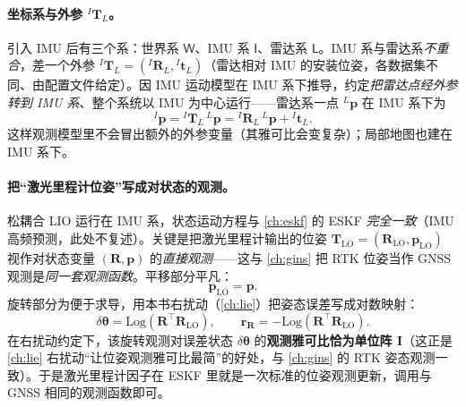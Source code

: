 \paragraph{坐标系与外参 ${}^I\mathbf{T}_L$。}
引入 IMU 后有三个系：世界系 $\mathsf{W}$、IMU 系 $\mathsf{I}$、雷达系 $\mathsf{L}$。IMU 系与雷达系\emph{不重合}，差一个外参 ${}^I\mathbf{T}_L=({}^I\mathbf{R}_L,{}^I\mathbf{t}_L)$（雷达相对 IMU 的安装位姿，各数据集不同、由配置文件给定）\cite{gao2023slamad}。因 IMU 运动模型在 IMU 系下推导，约定\emph{把雷达点经外参转到 IMU 系}、整个系统以 IMU 为中心运行——雷达系一点 ${}^L\mathbf{p}$ 在 IMU 系下为
\begin{equation}
  {}^I\mathbf{p}={}^I\mathbf{T}_L\,{}^L\mathbf{p}={}^I\mathbf{R}_L\,{}^L\mathbf{p}+{}^I\mathbf{t}_L.
  \label{eq:lidar-loose-extrin}
\end{equation}
这样观测模型里不会冒出额外的外参变量（其雅可比会变复杂）；局部地图也建在 IMU 系下。

\paragraph{把“激光里程计位姿”写成对状态的观测。}
松耦合 LIO 运行在 IMU 系，状态运动方程与 \cref{ch:eskf} 的 ESKF \emph{完全一致}（IMU 高频预测，此处不复述）。关键是把激光里程计输出的位姿 $\mathbf{T}_{\text{LO}}=(\mathbf{R}_{\text{LO}},\mathbf{p}_{\text{LO}})$ 视作对状态变量 $(\mathbf{R},\mathbf{p})$ 的\emph{直接观测}——这与 \cref{ch:gins} 把 RTK 位姿当作 GNSS 观测是\emph{同一套观测函数}\cite{gao2023slamad}。平移部分平凡：
\begin{equation}
  \mathbf{p}_{\text{LO}}=\mathbf{p}.
  \label{eq:lidar-loose-pobs}
\end{equation}
旋转部分为便于求导，用本书右扰动（\cref{ch:lie}）把姿态误差写成对数映射：
\begin{equation}
  \delta\boldsymbol\theta=\mathrm{Log}(\mathbf{R}^\top\mathbf{R}_{\text{LO}}),\qquad
  \mathbf{r}_{\mathbf{R}}=-\mathrm{Log}(\mathbf{R}^\top\mathbf{R}_{\text{LO}}).
  \label{eq:lidar-loose-robs}
\end{equation}
在右扰动约定下，该旋转观测对误差状态 $\delta\boldsymbol\theta$ 的\textbf{观测雅可比恰为单位阵 $\mathbf{I}$}（这正是 \cref{ch:lie} 右扰动“让位姿观测雅可比最简”的好处，与 \cref{ch:gins} 的 RTK 姿态观测一致）。于是激光里程计因子在 ESKF 里就是一次标准的位姿观测更新，调用与 GNSS 相同的观测函数即可。

